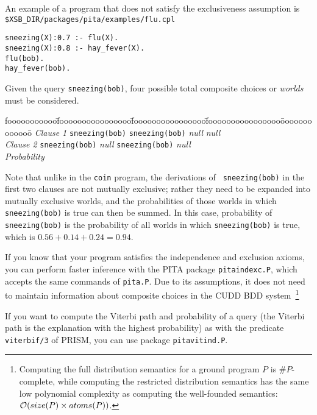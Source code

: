 \begin{example} \rm 
An example of a program that does not satisfy the exclusiveness
assumption is {\tt \$XSB\_DIR/packages/pita/examples/flu.cpl} 

\begin{verbatim} 
sneezing(X):0.7 :- flu(X).  
sneezing(X):0.8 :- hay_fever(X).  
flu(bob).
hay_fever(bob).
\end{verbatim}

Given the query {\tt sneezing(bob)}, four possible total composite choices or {\em worlds} must
be considered.

\begin{tabbing}
fooooooooooo\=foooooooooooooooo\=foooooooooooooooo\=foooooooooooooooo\=ooooooooooooo\=\kill
{\em Clause 1}    \> {\tt sneezing(bob)} \> {\tt sneezing(bob)} \> {\em null}          \> {\em null} \\
{\em Clause 2}    \> {\tt sneezing(bob)} \> {\em null}          \> {\tt sneezing(bob)} \> {\em null} \\
{\em Probability}                                    
\end{tabbing}
\noindent
Note that unlike in the {\tt coin} program, the derivations of {\tt
  sneezing(bob)} in the first two clauses are not mutually exclusive;
rather they need to be expanded into mutually exclusive worlds, and
the probabilities of those worlds in which {\tt sneezing(bob)} is true
can then be summed.  In this case, probability of {\tt sneezing(bob)}
is the probability of all worlds in which {\tt sneezing(bob)} is true,
which is $0.56+0.14+0.24=0.94$.
\end{example}

If you know that your program satisfies the independence and exclusion
axioms, you can perform faster inference with the PITA package
\texttt{pitaindexc.P}, which accepts the same commands of
\texttt{pita.P}.  Due to its assumptions, it does not need to maintain
information about composite choices in the CUDD BDD
system~\footnote{Computing the full distribution semantics for a
  ground program $P$ is $\#P$-complete, while computing the restricted
  distribution semantics has the same low polynomial complexity as
  computing the well-founded semantics: ${\cal O}(size(P) \times
  atoms(P))$.}

If you want to compute the Viterbi path and probability of a query
(the Viterbi path is the explanation with the highest probability) as
with the predicate \texttt{viterbif/3} of PRISM, you can use package
\texttt{pitavitind.P}.

